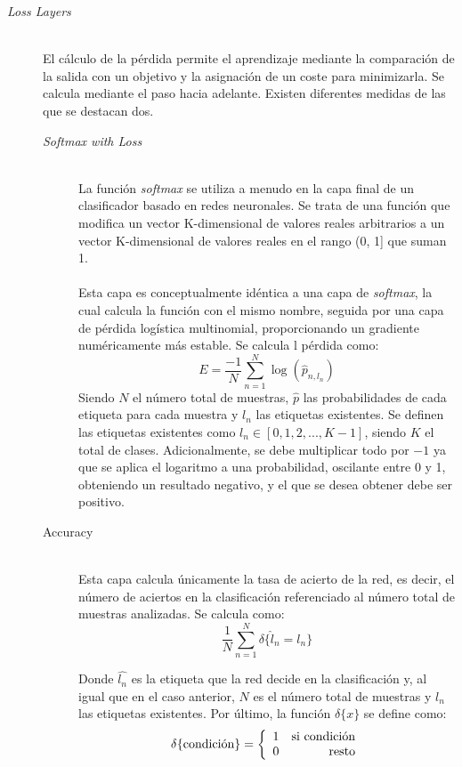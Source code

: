 \begin{description}
\item[\textit{Loss Layers}] \hfill 
\vspace{10pt}
\\
	El cálculo de la pérdida permite el aprendizaje mediante la comparación de la salida con un objetivo y la asignación de un coste para minimizarla. Se calcula mediante el paso hacia adelante. Existen diferentes medidas de las que se destacan dos.
	\vspace{10pt}
	\begin{description}
	\item[\textit{Softmax with Loss}] \hfill 
	\vspace{5pt}
	\\
		La función \textit{softmax} se utiliza a menudo en la capa final de un clasificador basado en redes neuronales. Se trata de una función que modifica un vector K-dimensional de valores reales arbitrarios a un vector K-dimensional de valores reales en el rango (0, 1] que suman 1.\\
		\vspace{-10pt}
		\\
		Esta capa es conceptualmente idéntica a una capa de \textit{softmax}, la cual calcula la función con el mismo nombre, seguida por una capa de pérdida logística multinomial, proporcionando un gradiente numéricamente más estable.
		Se calcula l pérdida como: 
		$$E = \frac{-1}{N} \sum\limits_{n=1}^N \log(\hat{p}_{n,l_n})$$
		Siendo $N$ el número total de muestras, $\hat{p}$ las probabilidades de cada etiqueta para cada muestra y $l_n$ las etiquetas existentes. Se definen las etiquetas existentes como $l_n\in[0, 1, 2, ..., K-1]$, siendo $K$ el total de clases. Adicionalmente, se debe multiplicar todo por $-1$ ya que se aplica el logaritmo a una probabilidad, oscilante entre 0 y 1, obteniendo un resultado negativo, y el que se desea obtener debe ser positivo.
		\vspace{10pt}
	\item[Accuracy] \hfill 
	\vspace{5pt}
	\\
		Esta capa calcula únicamente la tasa de acierto de la red, es decir, el número de aciertos en la clasificación referenciado al número total de muestras analizadas.
		Se calcula como:
		$$\frac{1}{N} \sum\limits_{n=1}^N \delta\{ \hat{l}_n = l_n \}$$

		Donde $\hat{l_n}$ es la etiqueta que la red decide en la clasificación y, al igual que en el caso anterior, $N$  es el número total de muestras y $l_n$ las etiquetas existentes. Por último, la función $\delta\{x\}$ se define como:
		$$\delta\{ \textup{condición}\} = \left\{ \begin{array}{lr} 1 &  \textup{si condición} \\ 0 & \mbox{resto} \end{array} \right.$$
	\end{description}
	
\end{description}
\vspace{10pt}

